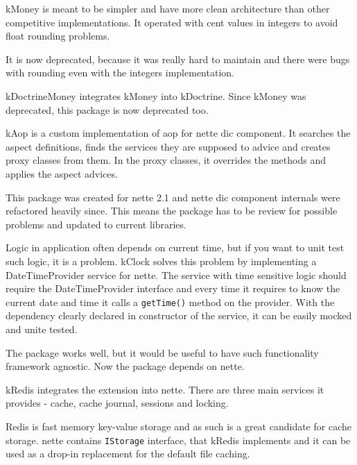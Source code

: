 \gls{kMoney} is meant to be simpler and have more clean architecture than other competitive implementations. It operated with cent values in integers to avoid float rounding problems.

It is now deprecated, because it was really hard to maintain and there were bugs with rounding even with the integers implementation.

 \label{sec:state:doctrine-money}

\gls{kDoctrineMoney} integrates \gls{kMoney} into \gls{kDoctrine}. Since \gls{kMoney} was deprecated, this package is now deprecated too.

 \label{sec:state:aop}

\gls{kAop} is a custom implementation of \gls{aop} for \gls{nette} \gls{dic} component. It searches the aspect definitions, finds the services they are supposed to advice and creates proxy classes from them. In the proxy classes, it overrides the methods and applies the aspect advices.

This package was created for \gls{nette} 2.1 and \gls{nette} \gls{dic} component internals were refactored heavily since. This means the package has to be review for possible problems and updated to current libraries.

 \label{sec:state:clock}

Logic in application often depends on current time, but if you want to unit test such logic, it is a problem. \gls{kClock} solves this problem by implementing a DateTimeProvider service for \gls{nette}. The service with time sensitive logic should require the DateTimeProvider interface and every time it requires to know the current date and time it calls a \lstinline{getTime()} method on the provider. With the dependency clearly declared in constructor of the service, it can be easily mocked and unite tested.

The package works well, but it would be useful to have such functionality framework agnostic. Now the package depends on \gls{nette}.

 \label{sec:state:redis}

\gls{kRedis} integrates the  extension  into \gls{nette}. There are three main services it provides - cache, cache journal, sessions and locking.

Redis is fast memory key-value storage and as such is a great candidate for cache storage. \gls{nette} contains \lstinline{IStorage} interface, that \gls{kRedis} implements and it can be used as a drop-in replacement for the default file caching.

